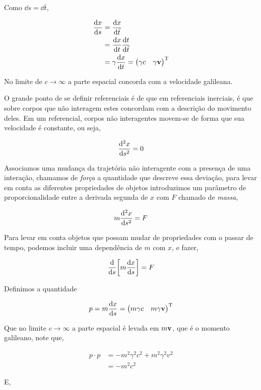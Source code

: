 \documentclass[twoside]{amsart}
\numberwithin{equation}{section}
\begin{document}
Como $\dd{s}=\dd{{\bar t}}$,

\begin{align}
    \dv{x}{s}&=\dv{x}{{\bar t}}\\
    &=\dv{x}{t}\dv{t}{{\bar t}}\\
    &=\gamma \dv{x}{t}=\mqty(\gamma c&\gamma\vb v)^{\textup T}
\end{align}

No limite de $c\rightarrow \infty$ a parte espacial concorda com a velocidade galileana.

O grande ponto de se definir referenciais é de que em referenciais inerciais, é que sobre corpos que não interagem estes concordam com a descrição do movimento deles. Em um referencial, corpos não interagentes movem-se de forma que sua velocidade é constante, ou seja,

\begin{align}
    \dv[2]{x}{s}=0
\end{align}

Associamos uma mudança da trajetória não interagente com a presença de uma interação, chamamos de \emph{força} a quantidade que descreve essa deviação, para levar em conta as diferentes propriedades de objetos introduzimos um parâmetro de proporcionalidade entre a derivada segunda de $x$ com $F$ chamado de \emph{massa},

\begin{align}
    m\dv[2]{x}{s}=F
\end{align}

Para levar em conta objetos que possam mudar de propriedades com o passar de tempo, podemos incluir uma dependência de $m$ com $x$, e fazer,

\begin{align}
    \dv{}{s}\qty[m\dv{x}{s}]=F
\end{align}

Definimos a quantidade 

\begin{align}
    p=m\dv{x}{s}=\mqty(m\gamma c& m\gamma \vb v)^{\textup T}
\end{align}

Que no limite $c\rightarrow \infty$ a parte espacial é levada em $m\vb v$, que é o momento galileano, note que, 

\begin{align}
    p\cdot p&=-m^2\gamma^2c^2+m^2\gamma^2v^2\\
    &=-m^2c^2
\end{align}

E,
\end{document}
